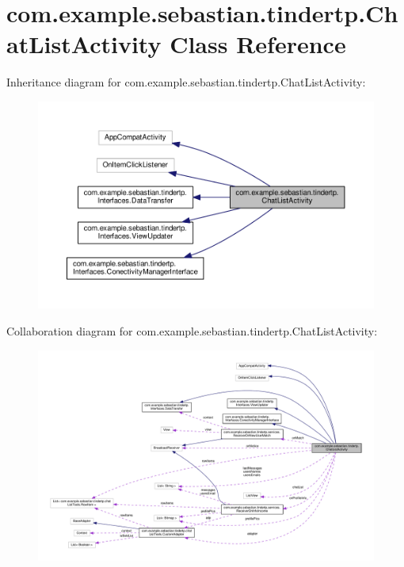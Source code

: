 \hypertarget{classcom_1_1example_1_1sebastian_1_1tindertp_1_1ChatListActivity}{}\section{com.\+example.\+sebastian.\+tindertp.\+Chat\+List\+Activity Class Reference}
\label{classcom_1_1example_1_1sebastian_1_1tindertp_1_1ChatListActivity}


Inheritance diagram for com.\+example.\+sebastian.\+tindertp.\+Chat\+List\+Activity\+:\nopagebreak
\begin{figure}[H]
\begin{center}
\leavevmode
\includegraphics[width=350pt]{classcom_1_1example_1_1sebastian_1_1tindertp_1_1ChatListActivity__inherit__graph}
\end{center}
\end{figure}


Collaboration diagram for com.\+example.\+sebastian.\+tindertp.\+Chat\+List\+Activity\+:\nopagebreak
\begin{figure}[H]
\begin{center}
\leavevmode
\includegraphics[width=350pt]{classcom_1_1example_1_1sebastian_1_1tindertp_1_1ChatListActivity__coll__graph}
\end{center}
\end{figure}

